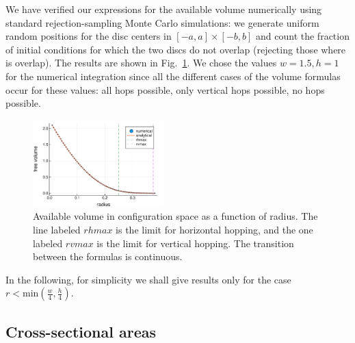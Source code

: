 \documentclass[superscriptaddress,pre,reprint,showpacs,twocolumn]{revtex4-1}
\begin{document}
We have verified our expressions for the available volume numerically using 
standard rejection-sampling Monte Carlo simulations: we 
generate uniform random positions for the disc centers in 
$[-a,a] \times [-b,b]$ and 
count the fraction of initial conditions for 
which the two discs do not overlap (rejecting those where is overlap).
The results are shown in Fig.~\ref{VolMonteC}.
We chose the values $w=1.5, h=1$ for the numerical integration since all the different
cases of the volume formulas occur for these values: all hops possible, only vertical
hops possible, no hops possible. 

\begin{figure}[h]
\centering
\includegraphics[width=0.45\textwidth]{./figures/FreeVolume01.pdf}
\caption{Available volume in configuration space as a function of radius. The
  line labeled $rhmax$ is the limit for horizontal hopping, and the one labeled
  $rvmax$ is the limit for vertical hopping. The transition between the formulas
is continuous.}
\label{VolMonteC}%
\end{figure}


In the following, for simplicity we shall give results only for the case $r < \text{min}(\frac{w}{4}, \frac{h}{4} )$.



\subsection{Cross-sectional areas}\label{areahop}
\end{document}
